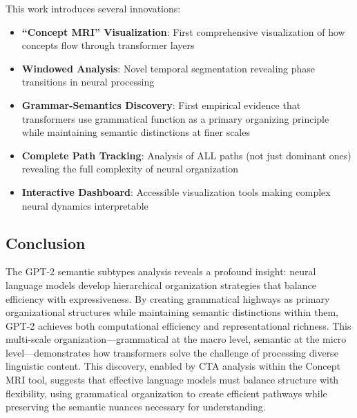 This work introduces several innovations:

\begin{itemize}
    \item \textbf{``Concept MRI'' Visualization}: First comprehensive visualization of how concepts flow through transformer layers
    \item \textbf{Windowed Analysis}: Novel temporal segmentation revealing phase transitions in neural processing
    \item \textbf{Grammar-Semantics Discovery}: First empirical evidence that transformers use grammatical function as a primary organizing principle while maintaining semantic distinctions at finer scales
    \item \textbf{Complete Path Tracking}: Analysis of ALL paths (not just dominant ones) revealing the full complexity of neural organization
    \item \textbf{Interactive Dashboard}: Accessible visualization tools making complex neural dynamics interpretable
\end{itemize}

\subsection{Conclusion}

The GPT-2 semantic subtypes analysis reveals a profound insight: neural language models develop hierarchical organization strategies that balance efficiency with expressiveness. By creating grammatical highways as primary organizational structures while maintaining semantic distinctions within them, GPT-2 achieves both computational efficiency and representational richness. This multi-scale organization—grammatical at the macro level, semantic at the micro level—demonstrates how transformers solve the challenge of processing diverse linguistic content. This discovery, enabled by CTA analysis within the Concept MRI tool, suggests that effective language models must balance structure with flexibility, using grammatical organization to create efficient pathways while preserving the semantic nuances necessary for understanding.